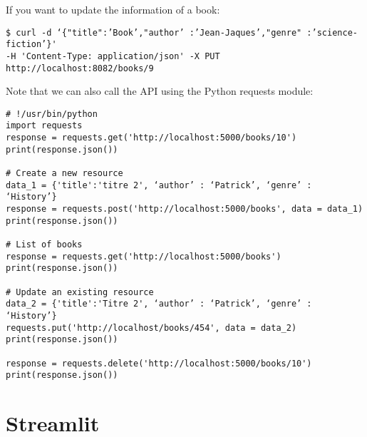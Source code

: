 \documentclass{beamer}[10pt, usepdftitle=false handout]
\begin{document}
\begin{frame}[fragile]
If you want to update the information of a book:
\vspace*{0.6em}
\begingroup
\fontsize{6pt}{8pt}\selectfont
\begin{verbatim}
$ curl -d ‘{"title":’Book’,"author’ :’Jean-Jaques’,"genre" :’science-fiction’}' 
-H 'Content-Type: application/json' -X PUT http://localhost:8082/books/9
\end{verbatim}
\endgroup

Note that we can also call the API using the Python requests module:

\begingroup
\fontsize{6pt}{8pt}\selectfont
\begin{verbatim}
# !/usr/bin/python
import requests
response = requests.get('http://localhost:5000/books/10')
print(response.json())

# Create a new resource
data_1 = {'title':'titre 2', ‘author’ : ‘Patrick’, ‘genre’ : ‘History’}
response = requests.post('http://localhost:5000/books', data = data_1)
print(response.json())

# List of books
response = requests.get('http://localhost:5000/books')
print(response.json())

# Update an existing resource
data_2 = {'title':'Titre 2', ‘author’ : ‘Patrick’, ‘genre’ : ‘History’}
requests.put('http://localhost/books/454', data = data_2)
print(response.json())

response = requests.delete('http://localhost:5000/books/10')
print(response.json())
\end{verbatim}
\endgroup

\end{frame}
\section{Streamlit}
\end{document}
